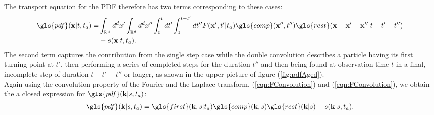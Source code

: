 The transport equation for the \gls{PDF} therefore has two terms corresponding to these cases:
%
\begin{align}
\gls{pdf}(\ve{x}|t,t_a) = &\int_{\mathbb{R}^d} d^{d}x' \int_{\mathbb{R}^d} d^{d}x'' \int_{0}^{t} dt' \int_{0}^{t-t'} d t''   F(\ve{x}',t'|t_a)  \gls{comp}(\ve{x}'',t'') \gls{rest}(\ve{x}-\ve{x}'-\ve{x}''| t-t'-t'') \nonumber \\
&+ s(\ve{x}|t,t_a).
\end{align}
%
The second term captures the contribution from the single step case while the double convolution describes a particle having its first turning point at $t'$, then performing a series of completed steps for the duration $t''$ and then being found at observation time $t$ in a final, incomplete step of duration $t-t'-t''$ or longer, as shown in the upper picture of figure (\ref{fig:pdfAged}).\\
Again using the convolution property of the Fourier and the Laplace transform,  (\ref{eqn:FConvolution}) and (\ref{eqn:FConvolution}), we obtain the a closed expression for $\gls{pdf}(\ve{k}|s,t_a)$:
%
\begin{align}
\gls{pdf}(\ve{k}|s,t_a) =  \gls{first}(\ve{k},s|t_a)  \gls{comp}(\ve{k},s) \gls{rest}(\ve{k}|s) + s(\ve{k}|s,t_a) \label{eqn:pdfAgedFourierLaplace}.
\end{align}



